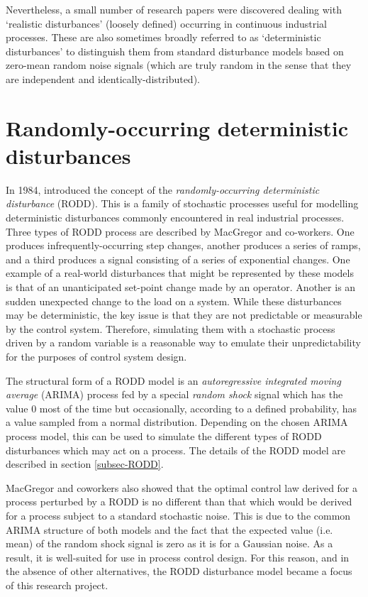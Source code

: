 Nevertheless, a small number of research papers were discovered dealing with `realistic disturbances' (loosely defined) occurring in continuous industrial processes. These are also sometimes broadly referred to as `deterministic disturbances' to distinguish them from standard disturbance models based on zero-mean random noise signals (which are truly random in the sense that they are independent and identically-distributed).

\section*{Randomly-occurring deterministic disturbances} \label{RODDs}

In 1984, \cite{macgregor_duality_1984} introduced the concept of the \textit{randomly-occurring deterministic disturbance} (RODD). This is a family of stochastic processes useful for modelling deterministic disturbances commonly encountered in real industrial processes. Three types of RODD process are described by MacGregor and co-workers. One produces infrequently-occurring step changes, another produces a series of ramps, and a third produces a signal consisting of a series of exponential changes. One example of a real-world disturbances that might be represented by these models is that of an unanticipated set-point change made by an operator. Another is an sudden unexpected change to the load on a system. While these disturbances may be deterministic, the key issue is that they are not predictable or measurable by the control system. Therefore, simulating them with a stochastic process driven by a random variable is a reasonable way to emulate their unpredictability for the purposes of control system design.

The structural form of a RODD model is an \textit{autoregressive integrated moving average} (ARIMA) process fed by a special \textit{random shock} signal which has the value 0 most of the time but occasionally, according to a defined probability, has a value sampled from a normal distribution. Depending on the chosen ARIMA process model, this can be used to simulate the different types of RODD disturbances which may act on a process. The details of the RODD model are described in section \ref{subsec-RODD}.

MacGregor and coworkers also showed that the optimal control law derived for a process perturbed by a RODD is no different than that which would be derived for a process subject to a standard stochastic noise.  This is due to the common ARIMA structure of both models and the fact that the expected value (i.e. mean) of the random shock signal is zero as it is for a Gaussian noise. As a result, it is well-suited for use in process control design. For this reason, and in the absence of other alternatives, the RODD disturbance model became a focus of this research project.

